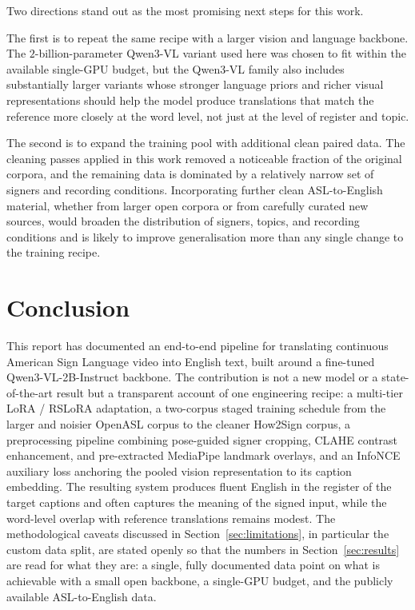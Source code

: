 \documentclass{article}
\begin{document}
Two directions stand out as the most promising next steps for this work.

The first is to repeat the same recipe with a larger vision and language
backbone. The $2$-billion-parameter Qwen3-VL variant used here was chosen
to fit within the available single-GPU budget, but the Qwen3-VL family
also includes substantially larger variants whose stronger language priors
and richer visual representations should help the model produce
translations that match the reference more closely at the word level, not
just at the level of register and topic.

The second is to expand the training pool with additional clean
paired data. The cleaning passes applied in this work removed a noticeable
fraction of the original corpora, and the remaining data is dominated by a
relatively narrow set of signers and recording conditions. Incorporating
further clean ASL-to-English material, whether from larger open corpora or
from carefully curated new sources, would broaden the distribution of
signers, topics, and recording conditions and is likely to improve
generalisation more than any single change to the training recipe.


\section{Conclusion}
\label{sec:conclusion}

This report has documented an end-to-end pipeline for translating continuous
American Sign Language video into English text, built around a fine-tuned
Qwen3-VL-2B-Instruct backbone. The contribution is not a new model or a
state-of-the-art result but a transparent account of one engineering
recipe: a multi-tier LoRA / RSLoRA adaptation, a two-corpus staged
training schedule from the larger and noisier OpenASL corpus to the cleaner
How2Sign corpus, a preprocessing pipeline combining pose-guided signer
cropping, CLAHE contrast enhancement, and pre-extracted MediaPipe landmark
overlays, and an InfoNCE auxiliary loss anchoring the pooled vision
representation to its caption embedding. The resulting system produces
fluent English in the register of the target captions and often captures
the meaning of the signed input, while the word-level overlap with
reference translations remains modest. The methodological caveats discussed
in Section~\ref{sec:limitations}, in particular the custom data split, are
stated openly so that the numbers in Section~\ref{sec:results} are read for
what they are: a single, fully documented data point on what is achievable
with a small open backbone, a single-GPU budget, and the publicly available
ASL-to-English data.
\end{document}
